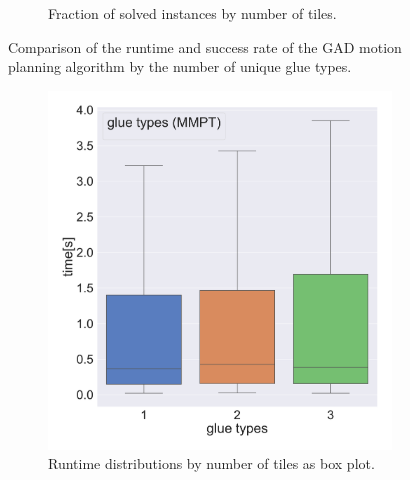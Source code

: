 \begin{figure}[htpb]
\begin{subfigure}[b]{0.48\textwidth}
\caption{Fraction of solved instances by number of tiles.}
\label{fig:gad_i1_fraction_solved_over_glue_types}
\end{subfigure}
\caption[Runtime and success rate of GAD by number of glue types] {Comparison of the runtime and success rate of the GAD motion planning algorithm by the number of unique glue types.}
\label{fig:i1_gad_glue_types}
\end{figure}

\begin{figure}[htpb]
\centering
\begin{subfigure}[b]{0.48\textwidth}
\centering
\includegraphics[width=\textwidth]{figures/plots/heuristic_solvers_i1/mmpt_i1_time_over_glue_types.pdf}
\caption{Runtime distributions by number of tiles as box plot.}
\label{fig:mmpt_i1_time_over_glue_types}
\end{subfigure}
\hfill
\begin{subfigure}[b]{0.48\textwidth}
\centering

\end{subfigure}
\end{figure}
